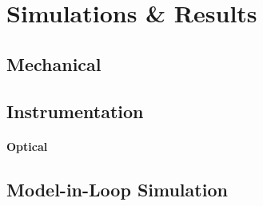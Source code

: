 \chapter{Simulations \& Results}
\thispagestyle{fancy}


\section{Mechanical}
\blindtext

\section{Instrumentation}
\blindtext
\subsubsection{Optical}

\section{Model-in-Loop Simulation}
\blindtext
